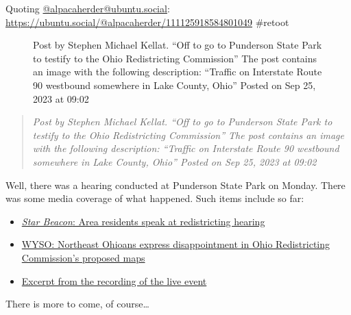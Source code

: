 Quoting
\href{https://ubuntu.social/@alpacaherder}{@alpacaherder@ubuntu.social}:
\url{https://ubuntu.social/@alpacaherder/111125918584801049} \#retoot

\begin{figure}
\centering
{}
\caption{Post by Stephen Michael Kellat. ``Off to go to Punderson State
Park to testify to the Ohio Redistricting Commission'' The post contains
an image with the following description: ``Traffic on Interstate Route
90 westbound somewhere in Lake County, Ohio'' Posted on Sep 25, 2023 at
09:02}
\end{figure}

\begin{quote}
\emph{Post by Stephen Michael Kellat. ``Off to go to Punderson State
Park to testify to the Ohio Redistricting Commission'' The post contains
an image with the following description: ``Traffic on Interstate Route
90 westbound somewhere in Lake County, Ohio'' Posted on Sep 25, 2023 at
09:02}
\end{quote}

Well, there was a hearing conducted at Punderson State Park on Monday.
There was some media coverage of what happened. Such items include so
far:

\begin{itemize}
\tightlist
\item
  \href{http://web.archive.org/web/20230926042215/https://www.starbeacon.com/news/local_news/area-residents-speak-at-redistricting-hearing/article_192dc5fc-5bce-11ee-8215-838565f9a63d.html}{\emph{Star
  Beacon}: Area residents speak at redistricting hearing}
\item
  \href{https://web.archive.org/web/20230926042703/https://www.wyso.org/2023-09-25/ohio-redistricting-commission-holds-public-hearing-in-geauga-county}{WYSO:
  Northeast Ohioans express disappointment in Ohio Redistricting
  Commission's proposed maps}
\item
  \href{https://www.ohiochannel.org/video/ohio-redistricting-commission-9-25-2023-1000am?start=930&end=1380}{Excerpt
  from the recording of the live event}
\end{itemize}

There is more to come, of course\ldots{}
